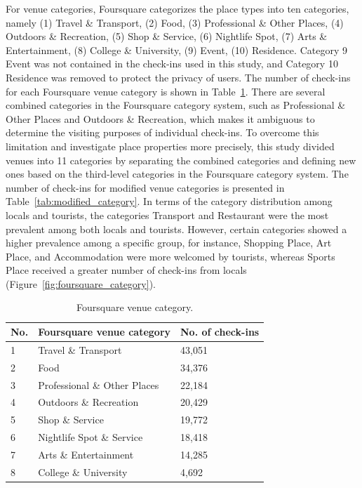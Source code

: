 \documentclass{article}
\theoremstyle{definition}
\theoremstyle{remark}
\begin{document}
For venue categories, Foursquare categorizes the place types into ten categories, namely (1) Travel \& Transport, (2) Food, (3) Professional \& Other Places, (4) Outdoors \& Recreation, (5) Shop \& Service, (6) Nightlife Spot, (7) Arts \& Entertainment, (8) College \& University, (9) Event, (10) Residence. Category 9 Event was not contained in the check-ins used in this study, and Category 10 Residence was removed to protect the privacy of users. The number of check-ins for each Foursquare venue category is shown in Table~\ref{tab:foursquare_category}. There are several combined categories in the Foursquare category system, such as Professional \& Other Places and Outdoors \& Recreation, which makes it ambiguous to determine the visiting purposes of individual check-ins. To overcome this limitation and investigate place properties more precisely, this study divided venues into 11 categories by separating the combined categories and defining new ones based on the third-level categories in the Foursquare category system. The number of check-ins for modified venue categories is presented in Table~\ref{tab:modified_category}. In terms of the category distribution among locals and tourists, the categories Transport and Restaurant were the most prevalent among both locals and tourists. However, certain categories showed a higher prevalence among a specific group, for instance, Shopping Place, Art Place, and Accommodation were more welcomed by tourists, whereas Sports Place received a greater number of check-ins from locals (Figure~\ref{fig:foursquare_category}).

\begin{table}[h!]
\centering
\caption{\label{tab:foursquare_category}Foursquare venue category.}
\begin{tabular}{lll} \hline
No. & Foursquare venue category & No. of check-ins \\ \hline
1 & Travel \& Transport & 43,051 \\
2 & Food & 34,376 \\
3 & Professional \& Other Places & 22,184 \\
4 & Outdoors \& Recreation & 20,429 \\
5 & Shop \& Service & 19,772 \\
6 & Nightlife Spot \& Service & 18,418 \\
7 & Arts \& Entertainment & 14,285 \\
8 & College \& University & 4,692 \\ \hline
\end{tabular}
\end{table}
\end{document}
